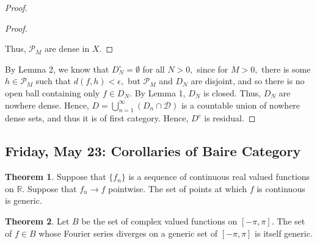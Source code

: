 \documentclass[10pt, oneside]{article}
\newcommand{\bbR}{\mathbb{R}}
\theoremstyle{definition}
\newtheorem{thm}{Theorem}
\begin{document}
\begin{proof}
\begin{proof}
\begin{figure}[H]
\end{figure}
Thus, $\mathcal{P}_M$ are dense in $X.$ 
\end{proof}
By Lemma 2, we know that $D_N^\circ  =  \emptyset$ for all $N>0,$ since for $M>0,$ there is some $h \in \mathcal{P}_M$ such that $d(f,h) < \epsilon,$ but $\mathcal{P}_M$ and $D_N$ are disjoint, and so there is no open ball containing only $f\in D_N.$ By Lemma 1, $D_N$ is closed. Thus, $D_N$ are nowhere dense. Hence, $D = \bigcup_{n=1}^\infty (D_n \cap \mathcal{D})$ is a countable union of nowhere dense sets, and thus it is of first category. Hence, $D^c$ is residual.

\end{proof}

\newpage
\subsection{Friday, May 23: Corollaries of Baire Category}
\begin{thm}
    Suppose that $\{f_n\}$ is a sequence of continuous real valued functions on $\bbR.$ Suppose that $f_n \to f$ pointwise. The set of points at which $f$ is continuous is generic. 
\end{thm}

\begin{thm}
    Let $B$ be the set of complex valued functions on $[-\pi, \pi].$ The set of $f\in B$ whose Fourier series diverges on a generic set of $[-\pi, \pi]$ is itself generic.
\end{thm}

\newpage
\end{document}
